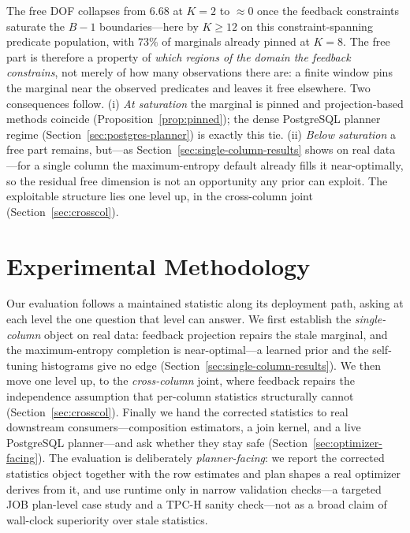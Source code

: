 \documentclass[preprint,12pt]{elsarticle}
\begin{document}
The free DOF collapses from $6.68$ at $K{=}2$ to $\approx 0$ once the feedback
constraints saturate the $B-1$ boundaries---here by $K{\geq}12$ on this
constraint-spanning predicate population, with $73\%$ of marginals already pinned at
$K{=}8$. The free part is therefore a property of \emph{which regions of the domain the
feedback constrains}, not merely of how many observations there are: a finite window pins
the marginal near the observed predicates and leaves it free elsewhere. Two consequences
follow. (i) \emph{At saturation} the marginal is pinned and projection-based methods coincide
(Proposition~\ref{prop:pinned}); the dense PostgreSQL planner regime
(Section~\ref{sec:postgres-planner}) is exactly this tie. (ii) \emph{Below saturation} a free
part remains, but---as Section~\ref{sec:single-column-results} shows on real data---for a
single column the maximum-entropy default already fills it near-optimally, so the residual
free dimension is not an opportunity any prior can exploit. The exploitable structure
lies one level up, in the cross-column joint (Section~\ref{sec:crosscol}).

\section{Experimental Methodology}
\label{sec:experiments}

Our evaluation follows a maintained statistic along its deployment path, asking at each level
the one question that level can answer. We first establish the \emph{single-column} object on
real data: feedback projection repairs the stale marginal, and the maximum-entropy completion
is near-optimal---a learned prior and the self-tuning histograms give no edge
(Section~\ref{sec:single-column-results}). We then move one level up, to the \emph{cross-column}
joint, where feedback repairs the independence assumption that per-column statistics
structurally cannot (Section~\ref{sec:crosscol}). Finally we hand the corrected statistics to
real downstream consumers---composition estimators, a join kernel, and a live PostgreSQL
planner---and ask whether they stay safe (Section~\ref{sec:optimizer-facing}). The evaluation
is deliberately \emph{planner-facing}: we report the corrected statistics object together with
the row estimates and plan shapes a real optimizer derives from it, and use runtime only in
narrow validation checks---a targeted JOB plan-level case study and a TPC-H sanity check---not
as a broad claim of wall-clock superiority over stale statistics.
\end{document}
